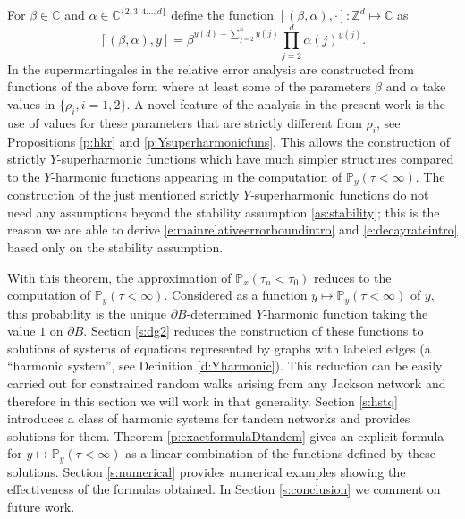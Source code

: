 \documentclass[11pt,a4paper]{article}
\begin{document}
For $\beta \in {\mathbb C}$ and $\alpha \in {\mathbb C}^{\{2,3,4...,d\}}$ 
define the function $[(\beta,\alpha),\cdot]:{\mathbb Z}^d \mapsto {\mathbb C}$
as
\[
[ (\beta,\alpha) , y  ] = \beta^{y(d)-\sum_{j=2}^n y(j)} \prod_{j=2}^d \alpha(j)^{y(j)}.
\]
In \cite{sezer2018approximation,unlu2019excessive,kabran2020approximation} the supermartingales in the relative error analysis are constructed from functions of the above form
where at least some of the parameters $\beta$ and $\alpha$ take values in $\{\rho_i, i=1,2\}$.
A novel feature of the analysis in the present work is the use of values for these parameters that are strictly different from $\rho_i$,
see Propositions \ref{p:hkr}  and \ref{p:Ysuperharmonicfuns}. 
This allows the construction of strictly $Y$-superharmonic functions which
have much simpler structures compared to the $Y$-harmonic functions appearing
in the computation of ${\mathbb P}_y(\tau < \infty)$. The construction
of the just mentioned 
strictly $Y$-superharmonic functions do not need any assumptions
beyond the stability assumption \eqref{as:stability}; 
this is the reason we are able to derive
\eqref{e:mainrelativeerrorboundintro} and \eqref{e:decayrateintro}
based only on the stability assumption. 

With this theorem, the approximation of ${\mathbb P}_x(\tau_n < \tau_0)$ reduces
to the computation of ${\mathbb P}_y(\tau < \infty).$ Considered as a function
$y\mapsto {\mathbb P}_y(\tau < \infty)$ of $y$, this probability is the unique
$\partial B$-determined $Y$-harmonic function taking the value $1$ on $\partial B.$
Section \ref{s:dg2} reduces the construction of these
functions to solutions of systems of equations represented by graphs 
with labeled edges
(a ``harmonic system'', see Definition
\ref{d:Yharmonic}). This reduction
can be easily carried out for constrained random walks arising from any Jackson network and
therefore in this section we will work in that generality. Section \ref{s:hstq}
introduces a class of
harmonic systems for tandem networks and provides  solutions
for them.
Theorem \ref{p:exactformulaDtandem} gives an explicit formula
for $y\mapsto {\mathbb P}_y(\tau < \infty)$ 
as a linear combination of the functions defined by these solutions.
Section \ref{s:numerical} provides numerical examples showing the effectiveness of the formulas obtained.
In Section \ref{s:conclusion} we comment on future work.
\end{document}
